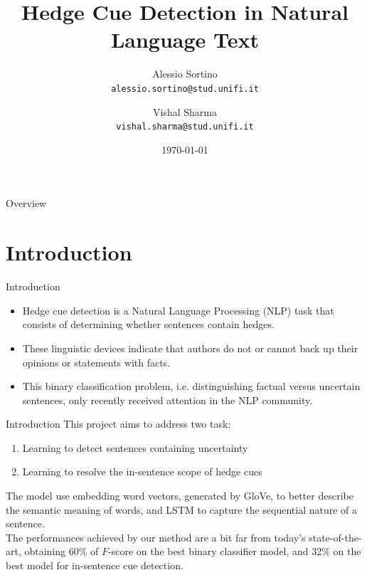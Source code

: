 \documentclass{beamer}
\title[Hedge Cue Detection]{Hedge Cue Detection in Natural Language Text}
\institute[]{{\large Machine Learning}\\\vspace{0.3cm}\textit{University of Florence, Department of Information Engineering}}
\author[A. Sortino, V. Sharma]
{\parbox[c]{1.5in}{Alessio Sortino\\\texttt{\tiny alessio.sortino@stud.unifi.it}} \and 
	\parbox[c]{1.5in}{Vishal Sharma\\\texttt{\tiny vishal.sharma@stud.unifi.it}}}
\date{\today}
\begin{document}
	
	
\frame[plain]{\titlepage} %

\usebackgroundtemplate
{
}


\begin{frame}{Overview}
	\tableofcontents
\end{frame}

\section{Introduction}
\begin{frame}{Introduction}
	\begin{itemize}\setlength\itemsep{1em}
		\item Hedge cue detection is a Natural Language Processing (NLP) 	task that consists of determining whether sentences contain hedges.
		\item These linguistic devices indicate that authors do not or cannot back up their opinions or statements with facts.
		\item This binary classification problem, i.e. distinguishing factual versus uncertain sentences, only recently received attention in the NLP community.
	\end{itemize}
\end{frame}
\begin{frame}{Introduction}
	This project aims to address two task:\\
	\begin{enumerate}\setlength\itemsep{1em}
		\item Learning to detect sentences containing uncertainty
		\item Learning to resolve the in-sentence scope of hedge cues
	\end{enumerate}
	\vspace{0.5cm}
	The model use embedding word vectors, generated by GloVe, to better describe the semantic meaning of words, and LSTM to capture the sequential nature of a sentence.\\
	\vspace{0.5cm}
	The performances achieved by our method are a bit far from today's state-of-the-art, obtaining 60\% of $F$-score on the best binary classifier model, and 32\% on the best model for in-sentence cue detection.
\end{frame}
\end{document}
